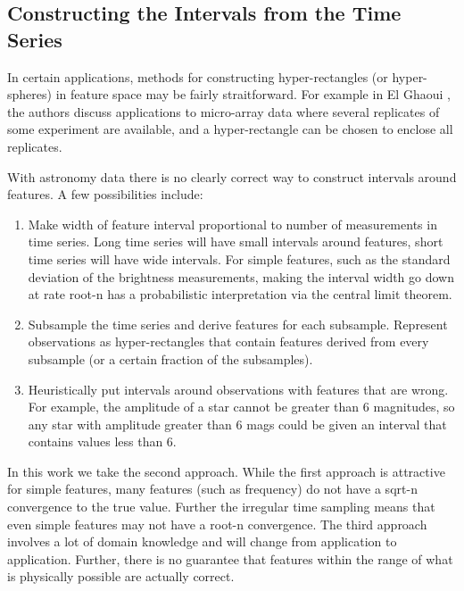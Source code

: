 \documentclass[11pt]{article}
\begin{document}
\subsection{Constructing the Intervals from the Time Series}
In certain applications, methods for constructing hyper-rectangles (or hyper-spheres) in feature space may be fairly straitforward. For example in El Ghaoui \cite{el2003robust}, the authors discuss applications to micro-array data where several replicates of some experiment are available, and a hyper-rectangle can be chosen to enclose all replicates.

With astronomy data there is no clearly correct way to construct intervals around features. A few possibilities include:
\begin{enumerate}
\item Make width of feature interval proportional to number of measurements in time series. Long time series will have small intervals around features, short time series will have wide intervals. For simple features, such as the standard deviation of the brightness measurements, making the interval width go down at rate root-n has a probabilistic interpretation via the central limit theorem.
\item Subsample the time series and derive features for each subsample. Represent observations as hyper-rectangles that contain features derived from every subsample (or a certain fraction of the subsamples).
\item Heuristically put intervals around observations with features that are wrong. For example, the amplitude of a star cannot be greater than 6 magnitudes, so any star with amplitude greater than 6 mags could be given an interval that contains values less than 6.
\end{enumerate}
In this work we take the second approach. While the first approach is attractive for simple features, many features (such as frequency) do not have a sqrt-n convergence to the true value. Further the irregular time sampling means that even simple features may not have a root-n convergence. The third approach involves a lot of domain knowledge and will change from application to application. Further, there is no guarantee that features within the range of what is physically possible are actually correct.
\end{document}
